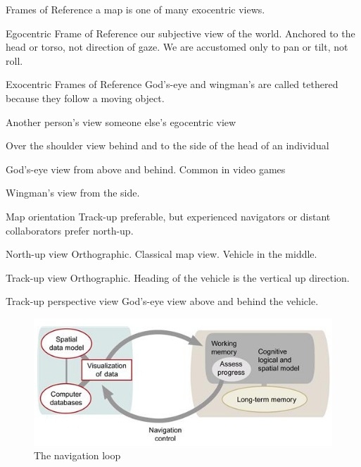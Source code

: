 \begin{mdframed}\begin{multicols}{2}
\begin{compactdesc}
\item[Frames of Reference] a map is one of many exocentric views.
\item[Egocentric Frame of Reference] our subjective view of the world. Anchored
    to the head or torso, not direction of gaze. We are accustomed only to pan
    or tilt, not roll.
\item[Exocentric Frames of Reference]  God's-eye and wingman's are called
    tethered because they follow a moving object.
    \begin{compactdesc}
    \item[Another person's view] someone else's egocentric view
    \item[Over the shoulder view] behind and to the side of the head of an
        individual
    \item[God's-eye view] from above and behind. Common in video games
    \item[Wingman's view] from the side.
    \end{compactdesc}
\item[Map orientation]
    Track-up preferable, but experienced navigators or distant collaborators
    prefer north-up.
    \begin{compactdesc}
    \item[North-up view] Orthographic. Classical map view. Vehicle in the middle.
    \item[Track-up view] Orthographic. Heading of the vehicle is the vertical up
        direction.
    \item[Track-up perspective view] God's-eye view above and behind the
        vehicle.
    \end{compactdesc}
\end{compactdesc}
\begin{figure}[H] \centering
    \includegraphics[width=\linewidth]{navigation_loop.png}
    \caption{The navigation loop}
\end{figure}
\end{multicols}\end{mdframed}





